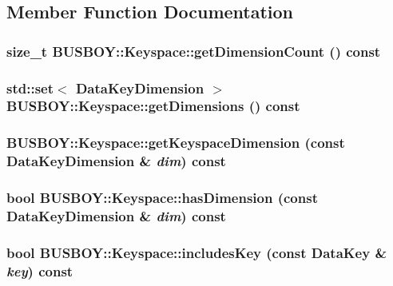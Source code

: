 \subsection{Member Function Documentation}
\hypertarget{classBUSBOY_1_1Keyspace_a6231d9b8c2ad0cb3805d8faab048aa8a}{
\subsubsection[{getDimensionCount}]{\setlength{\rightskip}{0pt plus 5cm}size\_\-t BUSBOY::Keyspace::getDimensionCount () const}}
\label{classBUSBOY_1_1Keyspace_a6231d9b8c2ad0cb3805d8faab048aa8a}
\hypertarget{classBUSBOY_1_1Keyspace_af5198ef0ed516b3f9930aee531a74301}{
\subsubsection[{getDimensions}]{\setlength{\rightskip}{0pt plus 5cm}std::set$<$ {\bf DataKeyDimension} $>$ BUSBOY::Keyspace::getDimensions () const}}
\label{classBUSBOY_1_1Keyspace_af5198ef0ed516b3f9930aee531a74301}
\hypertarget{classBUSBOY_1_1Keyspace_a8758b9fc44586313eb03afd29c25fdb2}{
\subsubsection[{getKeyspaceDimension}]{ BUSBOY::Keyspace::getKeyspaceDimension (const {\bf DataKeyDimension} \& {\em dim}) const}}
\label{classBUSBOY_1_1Keyspace_a8758b9fc44586313eb03afd29c25fdb2}
\hypertarget{classBUSBOY_1_1Keyspace_ab2c66ef737eab0700d89329481931218}{
\subsubsection[{hasDimension}]{\setlength{\rightskip}{0pt plus 5cm}bool BUSBOY::Keyspace::hasDimension (const {\bf DataKeyDimension} \& {\em dim}) const}}
\label{classBUSBOY_1_1Keyspace_ab2c66ef737eab0700d89329481931218}
\hypertarget{classBUSBOY_1_1Keyspace_a76c9ccb68e6856806ef0099fd866cf0f}{
\subsubsection[{includesKey}]{\setlength{\rightskip}{0pt plus 5cm}bool BUSBOY::Keyspace::includesKey (const {\bf DataKey} \& {\em key}) const}}
\label{classBUSBOY_1_1Keyspace_a76c9ccb68e6856806ef0099fd866cf0f}


